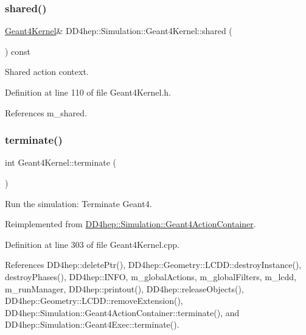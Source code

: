 \subsubsection{\texorpdfstring{shared()}{shared()}}
{\footnotesize\ttfamily \hyperlink{class_d_d4hep_1_1_simulation_1_1_geant4_kernel}{Geant4\+Kernel}\& D\+D4hep\+::\+Simulation\+::\+Geant4\+Kernel\+::shared (\begin{DoxyParamCaption}{ }\end{DoxyParamCaption}) const\hspace{0.3cm}{\ttfamily [inline]}}



Shared action context. 



Definition at line 110 of file Geant4\+Kernel.\+h.



References m\+\_\+shared.

\hypertarget{class_d_d4hep_1_1_simulation_1_1_geant4_kernel_ae73e828fed81e3343fe49f08701d3ac3}{}\label{class_d_d4hep_1_1_simulation_1_1_geant4_kernel_ae73e828fed81e3343fe49f08701d3ac3} 
\subsubsection{\texorpdfstring{terminate()}{terminate()}}
{\footnotesize\ttfamily int Geant4\+Kernel\+::terminate (\begin{DoxyParamCaption}{ }\end{DoxyParamCaption})\hspace{0.3cm}{\ttfamily [virtual]}}



Run the simulation\+: Terminate Geant4. 



Reimplemented from \hyperlink{class_d_d4hep_1_1_simulation_1_1_geant4_action_container_ad9cfc3e1bc35d384f5dbd4e8747ddf69}{D\+D4hep\+::\+Simulation\+::\+Geant4\+Action\+Container}.



Definition at line 303 of file Geant4\+Kernel.\+cpp.



References D\+D4hep\+::delete\+Ptr(), D\+D4hep\+::\+Geometry\+::\+L\+C\+D\+D\+::destroy\+Instance(), destroy\+Phases(), D\+D4hep\+::\+I\+N\+FO, m\+\_\+global\+Actions, m\+\_\+global\+Filters, m\+\_\+lcdd, m\+\_\+run\+Manager, D\+D4hep\+::printout(), D\+D4hep\+::release\+Objects(), D\+D4hep\+::\+Geometry\+::\+L\+C\+D\+D\+::remove\+Extension(), D\+D4hep\+::\+Simulation\+::\+Geant4\+Action\+Container\+::terminate(), and D\+D4hep\+::\+Simulation\+::\+Geant4\+Exec\+::terminate().



